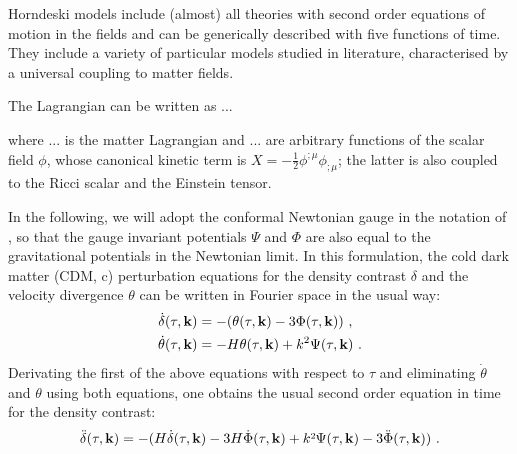 Horndeski models include (almost) all theories
with second order equations of motion in the fields and can be generically
described with five functions of time. They include a variety of particular
models studied in literature, characterised by a universal coupling
to matter fields.

The Lagrangian can be written as ...

where ... is the matter Lagrangian and ... are arbitrary functions
of the scalar field $\phi$, whose canonical kinetic term is $X=-\frac{1}{2}\phi^{;\mu}\phi_{;\mu}$;
the latter is also coupled to the Ricci scalar and the Einstein tensor.

In the following, we will adopt the conformal Newtonian gauge in the
notation of \citep{MaBertschinger}, so that the gauge invariant potentials
$\Psi$ and $\Phi$ are also equal to the gravitational potentials
in the Newtonian limit. In this formulation, the cold dark matter
(CDM, c) perturbation equations for the density contrast $\delta$
and the velocity divergence $\theta$ can be written in Fourier space
in the usual way: 
\begin{align}
\dot{\delta}(\tau,\mathbf{k}) & =-(\theta(\tau,\mathbf{k})-3\Phi(\tau,\mathbf{k}))\,\,,\\
\dot{\theta}(\tau,\mathbf{k}) & =-H\theta(\tau,\mathbf{k})+k^{2}\Psi(\tau,\mathbf{k})\,\,.
\end{align}
Derivating the first of the above equations with respect to $\tau$
and eliminating $\dot{\theta}$ and $\theta$ using both equations,
one obtains the usual second order equation in time for the density
contrast: 
\begin{equation}
\ddot{\delta}(\tau,\vk k)=-(H\dot{\delta}(\tau,\vk k)-3H\dot{\Phi}(\tau,\vk k)+k\text{\texttwosuperior}\Psi(\tau,\vk k)-3\ddot{\Phi}(\tau,\vk k))\,\,.\label{eq:deltadotdot}
\end{equation}

